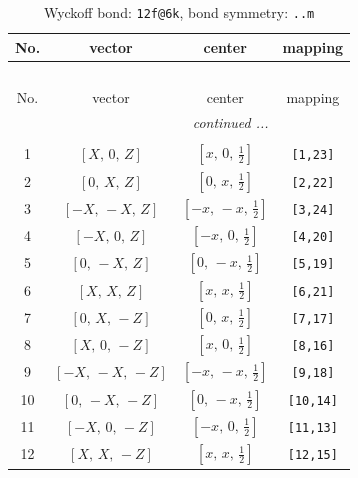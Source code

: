 \documentclass[fleqn,8pt]{jsarticle}
\begin{document}
\renewcommand{\arraystretch}{1.2}
\begin{longtable}{cccc}
\caption{Wyckoff bond: {\tt 12f@6k}, bond symmetry: {\tt ..m}}
 \\
 \hline \hline
No. & vector & center & mapping \\ \hline \endfirsthead

\multicolumn{3}{l}{\tablename\ \thetable{}} \\
 \hline \hline
No. & vector & center & mapping \\ \hline \endhead

 \hline \hline
\multicolumn{3}{r}{\footnotesize\it continued ...} \\ \endfoot

 \hline \hline
\multicolumn{3}{r}{} \\ \endlastfoot

1 & $\left[ X,\, 0,\, Z \right]$ & $\left[ x,\, 0,\, \frac{1}{2} \right]$ & {\tt [1,23]} \\ \hline
2 & $\left[ 0,\, X,\, Z \right]$ & $\left[ 0,\, x,\, \frac{1}{2} \right]$ & {\tt [2,22]} \\ \hline
3 & $\left[ - X,\, - X,\, Z \right]$ & $\left[ - x,\, - x,\, \frac{1}{2} \right]$ & {\tt [3,24]} \\ \hline
4 & $\left[ - X,\, 0,\, Z \right]$ & $\left[ - x,\, 0,\, \frac{1}{2} \right]$ & {\tt [4,20]} \\ \hline
5 & $\left[ 0,\, - X,\, Z \right]$ & $\left[ 0,\, - x,\, \frac{1}{2} \right]$ & {\tt [5,19]} \\ \hline
6 & $\left[ X,\, X,\, Z \right]$ & $\left[ x,\, x,\, \frac{1}{2} \right]$ & {\tt [6,21]} \\ \hline
7 & $\left[ 0,\, X,\, - Z \right]$ & $\left[ 0,\, x,\, \frac{1}{2} \right]$ & {\tt [7,17]} \\ \hline
8 & $\left[ X,\, 0,\, - Z \right]$ & $\left[ x,\, 0,\, \frac{1}{2} \right]$ & {\tt [8,16]} \\ \hline
9 & $\left[ - X,\, - X,\, - Z \right]$ & $\left[ - x,\, - x,\, \frac{1}{2} \right]$ & {\tt [9,18]} \\ \hline
10 & $\left[ 0,\, - X,\, - Z \right]$ & $\left[ 0,\, - x,\, \frac{1}{2} \right]$ & {\tt [10,14]} \\ \hline
11 & $\left[ - X,\, 0,\, - Z \right]$ & $\left[ - x,\, 0,\, \frac{1}{2} \right]$ & {\tt [11,13]} \\ \hline
12 & $\left[ X,\, X,\, - Z \right]$ & $\left[ x,\, x,\, \frac{1}{2} \right]$ & {\tt [12,15]} \\
\end{longtable}
\end{document}
